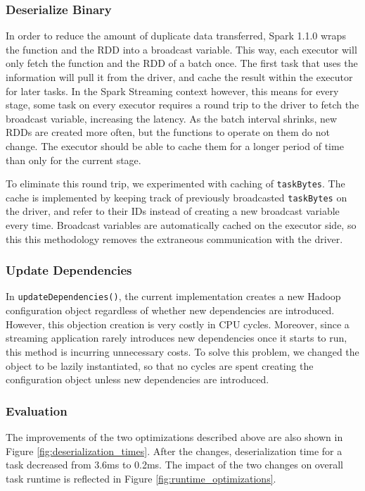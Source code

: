 \subsubsection{Deserialize Binary}
In order to reduce the amount of duplicate data transferred, Spark 1.1.0 wraps the function and the RDD into a broadcast variable. This way, each executor will only fetch the function and the RDD of a batch once. The first task that uses the information will pull it from the driver, and cache the result within the executor for later tasks. In the Spark Streaming context however, this means for every stage, some task on every executor requires a round trip to the driver to fetch the broadcast variable, increasing the latency. As the batch interval shrinks, new RDDs are created more often, but the functions to operate on them do not change. The executor should be able to cache them for a longer period of time than only for the current stage.

To eliminate this round trip, we experimented with caching of \texttt{taskBytes}. The cache is implemented by keeping track of previously broadcasted \texttt{taskBytes} on the driver, and refer to their IDs instead of creating a new broadcast variable every time. Broadcast variables are automatically cached on the executor side, so this this methodology removes the extraneous communication with the driver.

\subsubsection{Update Dependencies}
In \texttt{updateDependencies()}, the current implementation creates a new Hadoop configuration object regardless of whether new dependencies are introduced. However, this objection creation is very costly in CPU cycles. Moreover, since a streaming application rarely introduces new dependencies once it starts to run, this method is incurring unnecessary costs. To solve this problem, we changed the object to be lazily instantiated, so that no cycles are spent creating the configuration object unless new dependencies are introduced.

\subsubsection{Evaluation}
The improvements of the two optimizations described above are also shown in Figure \ref{fig:deserialization_times}. After the changes, deserialization time for a task decreased from 3.6ms to 0.2ms. The impact of the two changes on overall task runtime is reflected in Figure \ref{fig:runtime_optimizations}.

